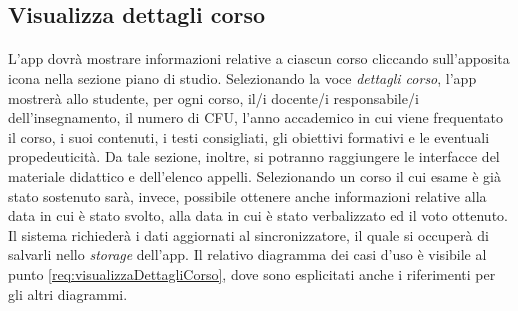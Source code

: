 \subsection{Visualizza dettagli corso}
\paragraph{} 
L’app dovrà mostrare informazioni relative a ciascun corso cliccando sull'apposita icona nella sezione piano di studio. Selezionando la voce \textit{dettagli corso}, l’app mostrerà allo studente, per ogni corso, il/i docente/i responsabile/i dell’insegnamento, il numero di CFU, l’anno accademico in cui viene frequentato il corso, i suoi contenuti, i testi consigliati, gli obiettivi formativi e le eventuali propedeuticità. Da tale sezione, inoltre, si potranno raggiungere le interfacce del materiale didattico e dell’elenco appelli. Selezionando un corso il cui esame è già stato sostenuto sarà, invece, possibile ottenere anche informazioni relative alla data in cui è stato svolto, alla data in cui è stato verbalizzato ed il voto ottenuto. Il sistema richiederà i dati aggiornati al sincronizzatore, il quale si occuperà di salvarli nello \textit{storage} dell’app.
Il relativo diagramma dei casi d'uso è visibile al punto \ref{req:visualizzaDettagliCorso}, dove sono esplicitati anche i riferimenti per gli altri diagrammi.
